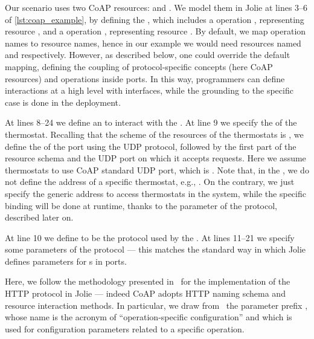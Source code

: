 Our scenario uses two CoAP resources:  and
. 
We model them in Jolie at lines 3--6
of \cref{lst:coap_example}, by defining the 
, which includes a
 operation , representing resource
, and a  operation
, representing resource .
%
By default, we map operation names to resource names, hence in our example we
would need resources named  and
 respectively. However, as described below, one
could override the default mapping, defining the coupling of protocol-specific
concepts (here CoAP resources) and operations inside ports. In this way,
programmers can define interactions at a high level with interfaces, while the
grounding to the specific case is done in the deployment.
% 

At lines 8--24 we define an  to interact with the
.
%
At line 9 we specify the  of the thermostat. Recalling that
the scheme of the resources of the thermostats is
, we define the  of
the port using the UDP  protocol, followed by the
first part of the resource schema  and the UDP port on
which it accepts requests. Here we assume thermostats to use CoAP standard UDP
port, which is . Note that, in the , we do
not define the address of a specific thermostat, e.g.,
. On the contrary, we just specify
the generic address to access thermostats in the system, while the specific
binding will be done at runtime, thanks to the  parameter of
the  protocol, described later on.

At line 10 we define  to be the protocol used by the 
. At lines 11--21 we specify some parameters of the
 protocol --- this matches the standard way in which Jolie defines
parameters for s in ports.

Here, we follow the methodology presented in~\cite{montesi16} for the
implementation of the HTTP protocol in Jolie --- indeed CoAP adopts HTTP naming
schema and resource interaction methods. In particular, we draw
from~\cite{montesi16} the parameter prefix , whose name is the
acronym of ``operation-specific configuration'' and which is used for
configuration parameters related to a specific operation.

